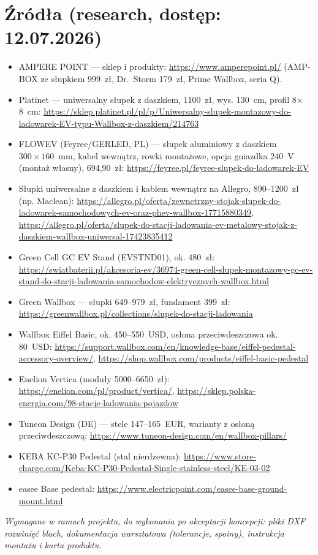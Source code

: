 \documentclass[11pt,a4paper]{article}
\begin{document}
\section*{Źródła (research, dostęp: 12.07.2026)}
\begin{itemize}\small
\item AMPERE POINT --- sklep i produkty: \url{https://www.amperepoint.pl/} (AMP-BOX ze słupkiem 999~zł,
Dr.~Storm 179~zł, Prime Wallbox, seria Q).
\item Platinet --- uniwersalny słupek z daszkiem, 1100~zł, wys. 130~cm, profil 8$\times$8~cm:
\url{https://sklep.platinet.pl/pl/p/Uniwersalny-slupek-montazowy-do-ladowarek-EV-typu-Wallbox-z-daszkiem/214763}
\item FLOWEV (Feyree/GERLED, PL) --- słupek aluminiowy z daszkiem $300\times160$~mm, kabel wewnątrz,
rowki montażowe, opcja gniazdka 240~V (montaż własny), 694,90~zł:
\url{https://feyree.pl/feyree-slupek-do-ladowarek-EV}
\item Słupki uniwersalne z daszkiem i kablem wewnątrz na Allegro, 890--1200~zł (np. Maclean):
\url{https://allegro.pl/oferta/zewnetrzny-stojak-slupek-do-ladowarek-samochodowych-ev-oraz-phev-wallbox-17715880349},
\url{https://allegro.pl/oferta/slupek-do-stacji-ladowania-ev-metalowy-stojak-z-daszkiem-wallbox-uniwersal-17423835412}
\item Green Cell GC EV Stand (EVSTND01), ok. 480~zł: \url{https://swiatbaterii.pl/akcesoria-ev/36974-green-cell-slupek-montazowy-gc-ev-stand-do-stacji-ladowania-samochodow-elektrycznych-wallbox.html}
\item Green Wallbox --- słupki 649--979~zł, fundament 399~zł:
\url{https://greenwallbox.pl/collections/slupek-do-stacji-ladowania}
\item Wallbox Eiffel Basic, ok. 450--550~USD, osłona przeciwdeszczowa ok. 80~USD:
\url{https://support.wallbox.com/en/knowledge-base/eiffel-pedestal-accessory-overview/},
\url{https://shop.wallbox.com/products/eiffel-basic-pedestal}
\item Enelion Vertica (moduły 5000--6650~zł): \url{https://enelion.com/pl/product/vertica/},
\url{https://sklep.polska-energia.com/98-stacje-ladowania-pojazdow}
\item Tuneon Design (DE) --- stele 147--165~EUR, warianty z osłoną przeciwdeszczową:
\url{https://www.tuneon-design.com/en/wallbox-pillars/}
\item KEBA KC-P30 Pedestal (stal nierdzewna): \url{https://www.store-charge.com/Keba-KC-P30-Pedestal-Single-stainless-steel/KE-03-02}
\item easee Base pedestal: \url{https://www.electricpoint.com/easee-base-ground-mount.html}
\end{itemize}

\vspace{0.6em}
\noindent\textit{Wymagane w ramach projektu, do wykonania po akceptacji koncepcji: pliki DXF
rozwinięć blach, dokumentacja warsztatowa (tolerancje, spoiny), instrukcja montażu i karta produktu.}
\end{document}
